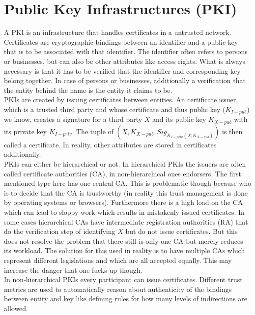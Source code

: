 
\section{Public Key Infrastructures (PKI)}
A PKI is an infrastructure that handles certificates in a untrusted network.
Certificates are cryptographic bindings between an identifier and a public key that is to be associated with that identifier.
The identifier often refers to persons or businesses, but can also be other attributes like access rights.
What is always necessary is that it has to be verified that the identifier and corresponding key belong together.
In case of persons or businesses, additionally a verification that the entity behind the name is the entity it claims to be.\\

PKIs are created by issuing certificates between entities.
An certificate issuer, which is a trusted third party and whose certificate and thus public key ($K_{I-pub}$) we know, creates a signature for a third party $X$ and its public key $K_{X-pub}$ with its private key $K_{I-priv}$.
The tuple of $(X,K_{X-pub},Sig_{K_{I-priv}(X|K_{X-pub})})$ is then called a certificate.
In reality, other attributes are stored in certificates additionally.\\

PKIs can either be hierarchical or not.
In hierarchical PKIs the issuers are often called certificate authorities (CA), in non-hierarchical ones endorsers.
The first mentioned type here has one central CA.
This is problematic though because who is to decide that the CA is trustworthy (in reality this trust management is done by operating systems or browsers).
Furthermore there is a high load on the CA which can lead to sloppy work which results in mistakenly issued certificates.
In some cases hierarchical CAs have intermediate registration authorities (RA) that do the verification step of identifying $X$ but do not issue certificates.
But this does not resolve the problem that there still is only one CA but merely reduces its workload.
The solution for this used in reality is to have multiple CAs which represent different legislations and which are all accepted equally.
This may increase the danger that one fucks up though.
\\
In non-hierarchical PKIs every participant can issue certificates.
Different trust metrics are used to automatically reason about authenticity of the bindings between entity and key like defining rules for how many levels of indirections are allowed.

